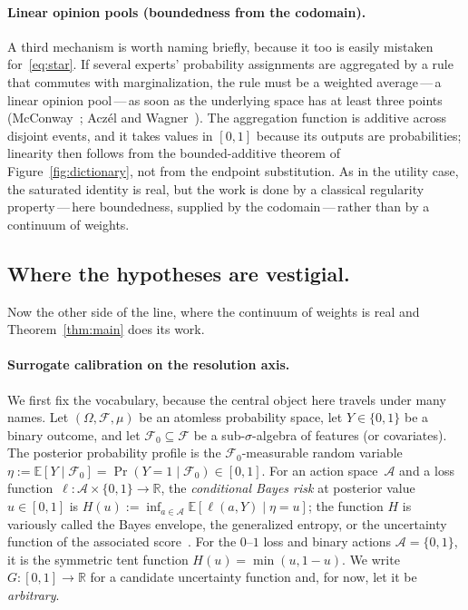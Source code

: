 \documentclass{article}
\theoremstyle{plain}
\theoremstyle{definition}
\newcommand{\R}{\mathbb{R}}
\newcommand{\E}{\mathbb{E}}
\begin{document}
\paragraph{Linear opinion pools (boundedness from the codomain).}
A third mechanism is worth naming briefly, because it too is easily
mistaken for~\eqref{eq:star}. If several experts' probability
assignments are aggregated by a rule that commutes with
marginalization, the rule must be a weighted average\,---\,a linear
opinion pool\,---\,as soon as the underlying space has at least three
points (McConway~\cite{McConway1981}; Acz\'el and
Wagner~\cite{AczelWagner1980}). The aggregation function is additive
across disjoint events, and it takes values in $[0,1]$ because its
outputs are probabilities; linearity then follows from the
bounded-additive theorem of Figure~\ref{fig:dictionary}, not from the
endpoint substitution. As in the utility case, the saturated identity
is real, but the work is done by a classical regularity
property\,---\,here boundedness, supplied by the codomain\,---\,rather
than by a continuum of weights.

\subsection{Where the hypotheses are vestigial.}
\label{ssec:vestigial}

Now the other side of the line, where the continuum of weights is
real and Theorem~\ref{thm:main} does its work.

\paragraph{Surrogate calibration on the resolution axis.}
We first fix the vocabulary, because the central object here travels
under many names. Let $(\Omega,\mathcal{F},\mu)$ be an atomless
probability space, let $Y\in\{0,1\}$ be a binary outcome, and let
$\mathcal{F}_0\subseteq\mathcal{F}$ be a sub-$\sigma$-algebra of features (or covariates).
The posterior probability profile is the $\mathcal{F}_0$-measurable
random variable $\eta:=\E[Y\mid\mathcal{F}_0]=\Pr(Y=1\mid\mathcal{F}_0)\in[0,1]$.
For an action space~$\mathcal{A}$ and a loss function~$\ell\colon\mathcal{A}\times\{0,1\}\to\R$,
the \emph{conditional Bayes risk} at posterior value~$u\in[0,1]$ is
$H(u):=\inf_{a\in\mathcal{A}}\E[\ell(a,Y)\mid \eta=u]$; the function $H$ is
variously called the Bayes envelope, the generalized entropy, or the
uncertainty function of the associated
score~\cite{Savage1971,DeGrootFienberg1983,GrunwaldDawid2004,GneitingRaftery2007}.
For the $0$--$1$ loss and binary actions $\mathcal{A}=\{0,1\}$, it is the symmetric tent function $H(u)=\min(u,1-u)$. We write
$G\colon[0,1]\to\R$ for a candidate uncertainty function and, for now,
let it be \emph{arbitrary}.
\end{document}
